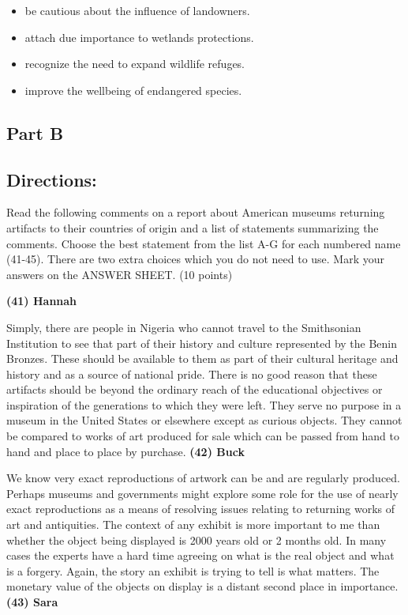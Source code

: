 \documentclass[UTF8,11pt]{ctexart}
\begin{document}
\begin{itemize}[leftmargin=2em,itemsep=.2em,topsep=.4em]\item[A.] be cautious about the influence of landowners.
\item[B.] attach due importance to wetlands protections.
\item[C.] recognize the need to expand wildlife refuges.
\item[D.] improve the wellbeing of endangered species.
\end{itemize}

\subsection*{\textbf{Part B}}


\subsection*{\textbf{Directions:}}


Read the following comments on a report about American museums returning artifacts to their countries of origin and a list of statements summarizing the comments. Choose the best statement from the list A-G for each numbered name (41-45). There are two extra choices which you do not need to use. Mark your answers on the ANSWER SHEET. (10 points)


\textbf{(41) Hannah}


Simply, there are people in Nigeria who cannot travel to the Smithsonian Institution to see that part of their history and culture represented by the Benin Bronzes. These should be available to them as part of their cultural heritage and history and as a source of national pride. There is no good reason that these artifacts should be beyond the ordinary reach of the educational objectives or inspiration of the generations to which they were left. They serve no purpose in a museum in the United States or elsewhere except as curious objects. They cannot be compared to works of art produced for sale which can be passed from hand to hand and place to place by purchase. \textbf{(42) Buck}


We know very exact reproductions of artwork can be and are regularly produced. Perhaps museums and governments might explore some role for the use of nearly exact reproductions as a means of resolving issues relating to returning works of art and antiquities. The context of any exhibit is more important to me than whether the object being displayed is 2000 years old or 2 months old. In many cases the experts have a hard time agreeing on what is the real object and what is a forgery. Again, the story an exhibit is trying to tell is what matters. The monetary value of the objects on display is a distant second place in importance. \textbf{(43) Sara}
\end{document}
